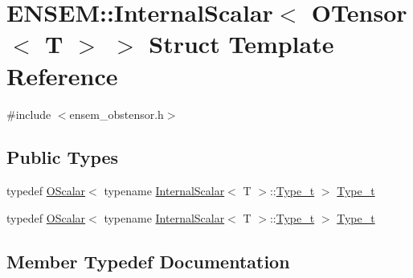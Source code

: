 \hypertarget{structENSEM_1_1InternalScalar_3_01OTensor_3_01T_01_4_01_4}{}\section{E\+N\+S\+EM\+:\+:Internal\+Scalar$<$ O\+Tensor$<$ T $>$ $>$ Struct Template Reference}
\label{structENSEM_1_1InternalScalar_3_01OTensor_3_01T_01_4_01_4}


{\ttfamily \#include $<$ensem\+\_\+obstensor.\+h$>$}

\subsection*{Public Types}
\begin{DoxyCompactItemize}
\item 
typedef \mbox{\hyperlink{classENSEM_1_1OScalar}{O\+Scalar}}$<$ typename \mbox{\hyperlink{structENSEM_1_1InternalScalar}{Internal\+Scalar}}$<$ T $>$\+::\mbox{\hyperlink{structENSEM_1_1InternalScalar_3_01OTensor_3_01T_01_4_01_4_a3f6b2482642650ffa201bbe320aaa7aa}{Type\+\_\+t}} $>$ \mbox{\hyperlink{structENSEM_1_1InternalScalar_3_01OTensor_3_01T_01_4_01_4_a3f6b2482642650ffa201bbe320aaa7aa}{Type\+\_\+t}}
\item 
typedef \mbox{\hyperlink{classENSEM_1_1OScalar}{O\+Scalar}}$<$ typename \mbox{\hyperlink{structENSEM_1_1InternalScalar}{Internal\+Scalar}}$<$ T $>$\+::\mbox{\hyperlink{structENSEM_1_1InternalScalar_3_01OTensor_3_01T_01_4_01_4_a3f6b2482642650ffa201bbe320aaa7aa}{Type\+\_\+t}} $>$ \mbox{\hyperlink{structENSEM_1_1InternalScalar_3_01OTensor_3_01T_01_4_01_4_a3f6b2482642650ffa201bbe320aaa7aa}{Type\+\_\+t}}
\end{DoxyCompactItemize}


\subsection{Member Typedef Documentation}
\mbox{\label{structENSEM_1_1InternalScalar_3_01OTensor_3_01T_01_4_01_4_a3f6b2482642650ffa201bbe320aaa7aa}} 
